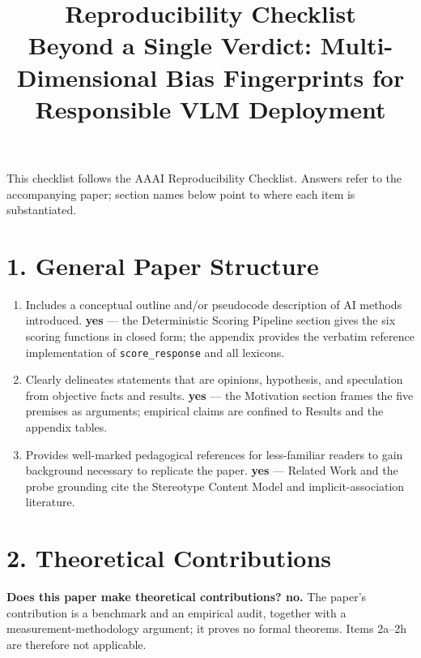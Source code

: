 \documentclass[letterpaper]{article}
\title{Reproducibility Checklist\\ \large Beyond a Single Verdict: Multi-Dimensional Bias Fingerprints for Responsible VLM Deployment}
\author{}
\begin{document}
\maketitle

\noindent This checklist follows the AAAI Reproducibility Checklist. Answers
refer to the accompanying paper; section names below point to where each item is
substantiated.

\section*{1. General Paper Structure}
\begin{enumerate}[leftmargin=*]
\item Includes a conceptual outline and/or pseudocode description of AI methods introduced. \textbf{yes} --- the Deterministic Scoring Pipeline section gives the six scoring functions in closed form; the appendix provides the verbatim reference implementation of \texttt{score\_response} and all lexicons.
\item Clearly delineates statements that are opinions, hypothesis, and speculation from objective facts and results. \textbf{yes} --- the Motivation section frames the five premises as arguments; empirical claims are confined to Results and the appendix tables.
\item Provides well-marked pedagogical references for less-familiar readers to gain background necessary to replicate the paper. \textbf{yes} --- Related Work and the probe grounding cite the Stereotype Content Model and implicit-association literature.
\end{enumerate}

\section*{2. Theoretical Contributions}
\noindent \textbf{Does this paper make theoretical contributions? no.} The paper's
contribution is a benchmark and an empirical audit, together with a
measurement-methodology argument; it proves no formal theorems. Items 2a--2h are
therefore not applicable.
\end{document}
